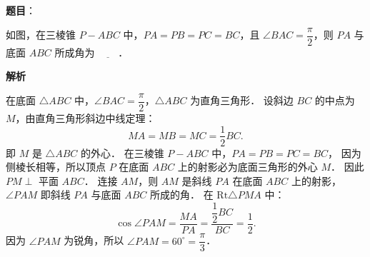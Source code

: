 \begin{answer}

\textbf{题目}：

如图，在三棱锥 $P - ABC$ 中，$PA = PB = PC = BC$，且 $\angle BAC = \dfrac{\pi}{2}$，则 $PA$ 与底面 $ABC$ 所成角为 $\underline{\hspace{2em}}$．
\nopagebreak[4]
\begin{center}\end{center}
\nopagebreak[4]
\textbf{解析}

在底面 $\triangle ABC$ 中，$\angle BAC = \dfrac{\pi}{2}$，$\triangle ABC$ 为直角三角形．
设斜边 $BC$ 的中点为 $M$，由直角三角形斜边中线定理：
\nopagebreak[4]
\[
MA = MB = MC = \dfrac{1}{2}BC.
\]
即 $M$ 是 $\triangle ABC$ 的外心．
在三棱锥 $P - ABC$ 中，$PA = PB = PC = BC$，
因为侧棱长相等，所以顶点 $P$ 在底面 $ABC$ 上的射影必为底面三角形的外心 $M$．
因此 $PM \perp$ 平面 $ABC$．
连接 $AM$，则 $AM$ 是斜线 $PA$ 在底面 $ABC$ 上的射影，
$\angle PAM$ 即斜线 $PA$ 与底面 $ABC$ 所成的角．
在 $\mathrm{Rt}\triangle PMA$ 中：
\nopagebreak[4]
\[
\cos\angle PAM = \dfrac{MA}{PA} = \dfrac{\dfrac{1}{2}BC}{BC} = \dfrac{1}{2}.
\]
因为 $\angle PAM$ 为锐角，所以 $\angle PAM = 60^\circ = \dfrac{\pi}{3}$．


\end{answer}
